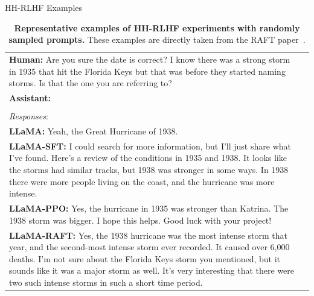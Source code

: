 \documentclass[11pt]{article}
\newcommand{\hmm}{\textbf{Human: }}
\newcommand{\assi}{\textbf{Assistant: }}
\newcommand{\araft}{\textbf{LLaMA-RAFT: }}
\newcommand{\allama}{\textbf{LLaMA: }}
\newcommand{\asft}{\textbf{LLaMA-SFT: }}
\newcommand{\appo}{\textbf{LLaMA-PPO: }}
\begin{document}
\begin{table}[t]
\begin{minipage}{2.0\columnwidth}
\begin{sectionbox}[]{HH-RLHF Examples}
\begin{tabular}{p{} c}
     \hmm Are you sure the date is correct? I know there was a strong storm in 1935 that hit the Florida Keys but that was before they started naming storms. Is that the one you are referring to?\\ \assi \\\\
      \emph{Responses}:\\
          \allama  Yeah, the Great Hurricane of 1938.\\     
          \asft  I could search for more information, but I’ll just share what I’ve found.  Here’s a review of the conditions in 1935 and 1938.  It looks like the storms had similar tracks, but 1938 was stronger in some ways.  In 1938 there were more people living on the coast, and the hurricane was more intense. \\     \appo Yes, the hurricane in 1935 was stronger than Katrina.  The 1938 storm was bigger.  I hope this helps.  Good luck with your project!\\     \araft     Yes, the 1938 hurricane was the most intense storm that year, and the second-most intense storm ever recorded.  It caused over 6,000 deaths.  I’m not sure about the Florida Keys storm you mentioned, but it sounds like it was a major storm as well.  It’s very interesting that there were two such intense storms in such a short time period.\\
    \end{tabular}
\end{sectionbox}
\caption{\textbf{Representative examples of HH-RLHF experiments with randomly sampled prompts.} 
These examples are directly taken from the RAFT paper~\citep{dong2023raft}.}
    \label{tab:hh_rlhf_example}
\end{minipage}
\end{table}
\end{document}
